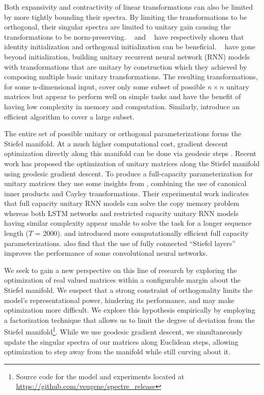 \documentclass{article} %
\begin{document}
Both expansivity and contractivity of linear transformations can also be limited by more tightly bounding their spectra. By limiting the transformations to be orthogonal, their singular spectra are limited to unitary gain causing the transformations to be norm-preserving. ~\citet{le2015simple} and ~\citet{henaff2016orthogonal} have respectively shown that identity initialization and orthogonal initialization can be beneficial. ~\citet{arjovsky2015unitary} have gone beyond initialization, building unitary recurrent neural network (RNN) models with transformations that are unitary by construction which they achieved by composing multiple basic unitary transformations. The resulting transformations, for some n-dimensional input, cover only some subset of possible $\mathit{n \times n}$ unitary matrices but appear to perform well on simple tasks and have the benefit of having low complexity in memory and computation. Similarly, \citep{jing2016tunable} introduce an efficient algorithm to cover a large subset.

The entire set of possible unitary or orthogonal parameterizations forms the Stiefel manifold. At a much higher computational cost, gradient descent optimization directly along this manifold can be done via geodesic steps \citep{nishimori2005note,tagare2011notes}. Recent work \citep{wisdom2016fullcap} has proposed the optimization of unitary matrices along the Stiefel manifold using geodesic gradient descent. To produce a full-capacity parameterization for unitary matrices they use some insights from \citet{tagare2011notes}, combining the use of canonical inner products and Cayley transformations. Their experimental work indicates that full capacity unitary RNN models can solve the copy memory problem whereas both LSTM networks and restricted capacity unitary RNN models having similar complexity appear unable to solve the task for a longer sequence length (${\mathit{T }}$ = 2000). \citet{hyland2017learning} and \citet{mhammedi2016efficient} introduced more computationally efficient full capacity parameterizations. \citet{harandi2016generalized} also find that the use of fully connected ``Stiefel layers'' improves the performance of some convolutional neural networks.

We seek to gain a new perspective on this line of research by exploring the optimization of real valued matrices within a configurable margin about the Stiefel manifold. We suspect that a strong constraint of orthogonality limits the model's representational power, hindering its performance, and may make optimization more difficult. We explore this hypothesis empirically by employing a factorization technique that allows us to limit the degree of deviation from the Stiefel manifold\footnote{Source code for the model and experiments located at \url{https://github.com/veugene/spectre_release}}. While we use geodesic gradient descent, we simultaneously update the singular spectra of our matrices along Euclidean steps, allowing optimization to step away from the manifold while still curving about it.
\end{document}
